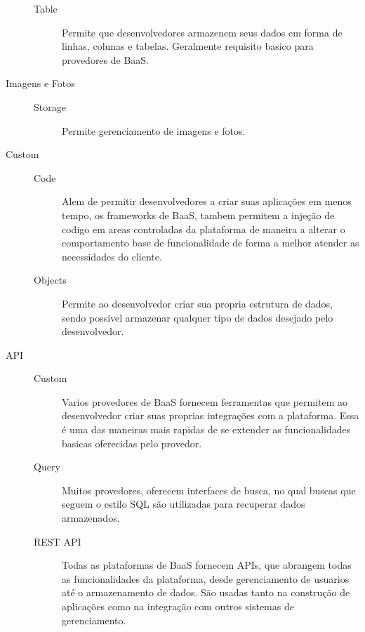 \begin{description}
\begin{description}
				\item[Table] { Permite que desenvolvedores armazenem seus dados em forma de linhas, colunas e tabelas. Geralmente requisito basico para provedores de BaaS.}

			\end{description}
		
		\item[Imagens e Fotos]
			\begin{description}
            	\item [] 
				\item[Storage] { Permite gerenciamento de imagens e fotos.}
			\end{description}
		

		\item[Custom]
			\begin{description}
            	\item[]
				\item[Code] { Alem de permitir desenvolvedores a criar suas aplicações em menos tempo, os frameworks de BaaS, tambem permitem a injeção de codigo em areas controladas da plataforma de maneira a alterar o comportamento base de funcionalidade de forma a melhor atender as necessidades do cliente.}

				\item[Objects] { Permite ao desenvolvedor criar sua propria estrutura de dados, sendo possivel armazenar qualquer tipo de dados desejado pelo desenvolvedor. }
			\end{description}
	

		\item[API]
			\begin{description}
            	\item[]
				\item[Custom] { Varios provedores de BaaS fornecem ferramentas que permitem ao desenvolvedor criar suas proprias integrações com a plataforma. Essa é uma das maneiras mais rapidas de se extender as funcionalidades basicas oferecidas pelo provedor. }

				\item[Query] { Muitos provedores, oferecem interfaces de busca, no qual buscas que seguem o estilo SQL são utilizadas para recuperar dados armazenados. }

				\item[REST API] { Todas as plataformas de BaaS fornecem APIs, que abrangem todas as funcionalidades da plataforma, desde gerenciamento de usuarios até o armazenamento de dados. São usadas tanto na construção de aplicações como na integração com outros sistemas de gerenciamento. }
			\end{description}
		

\end{description}
